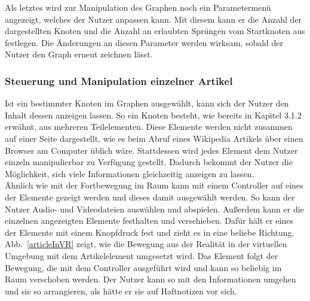 \documentclass[12pt, a4paper]{article}
\begin{document}
Als letztes wird zur Manipulation des Graphen noch ein Parametermenü angezeigt, welches der Nutzer anpassen kann. Mit diesem kann er die Anzahl der dargestellten Knoten und die Anzahl an erlaubten Sprüngen vom Startknoten aus festlegen. Die Änderungen an diesen Parameter werden wirksam, sobald der Nutzer den Graph erneut zeichnen lässt.\\

\subsubsection{Steuerung und Manipulation einzelner Artikel}
Ist ein bestimmter Knoten im Graphen ausgewählt, kann sich der Nutzer den Inhalt dessen anzeigen lassen. So ein Knoten besteht, wie bereits in Kapitel 3.1.2 erwähnt, aus mehreren Teilelementen. Diese Elemente werden nicht zusammen auf einer Seite dargestellt, wie es beim Abruf eines Wikipedia Artikels über einen Browser am Computer üblich wäre. Stattdessen wird jedes Element dem Nutzer einzeln manipulierbar zu Verfügung gestellt. Dadurch bekommt der Nutzer die Möglichkeit, sich viele Informationen gleichzeitig anzeigen zu lassen.\\

Ähnlich wie mit der Fortbewegung im Raum kann mit einem Controller auf eines der Elemente gezeigt werden und dieses damit ausgewählt werden. So kann der Nutzer Audio- und Videodateien auswählen und abspielen. Außerdem kann er die einzelnen angezeigten Elemente festhalten und verschieben. Dafür hält er eines der Elemente mit einem Knopfdruck fest und zieht es in eine beliebe Richtung. Abb.~\ref{articleInVR} zeigt, wie die Bewegung aus der Realität in der virtuellen Umgebung mit dem Artikelelement umgesetzt wird. Das Element folgt der Bewegung, die mit dem Controller ausgeführt wird und kann so beliebig im Raum verschoben werden. Der Nutzer kann so mit den Informationen umgehen und sie so arrangieren, als hätte er sie auf Haftnotizen vor sich.\\
\end{document}
